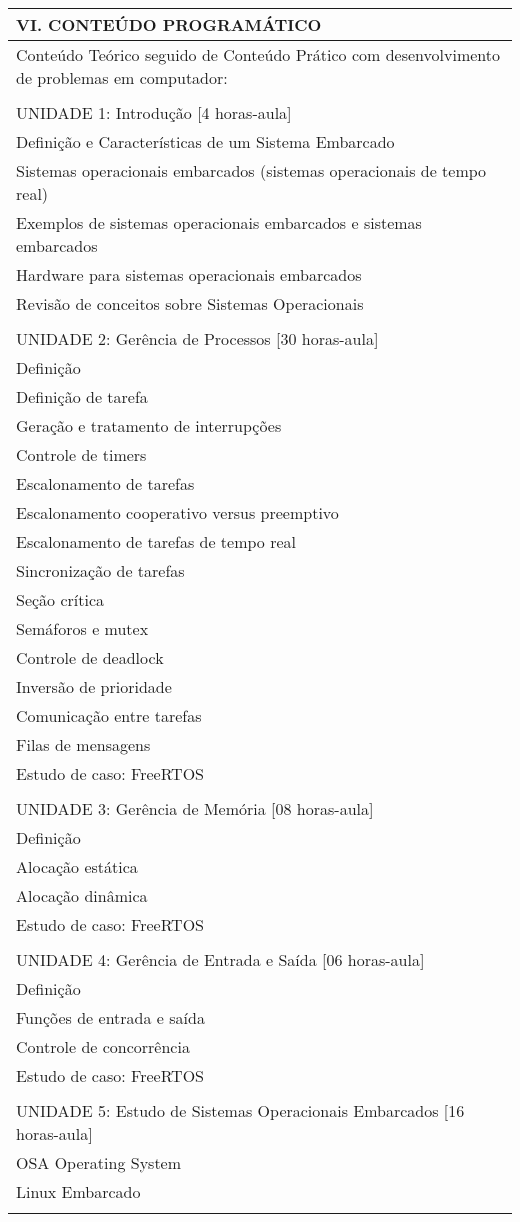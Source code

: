 \documentclass[12pt]{article}
\begin{document}
\begin{longtable}{|L{1.025\textwidth}|} \hline
%
{\bf VI. CONTEÚDO PROGRAMÁTICO } \\ \hline
Conteúdo Teórico seguido de Conteúdo Prático com desenvolvimento de problemas em computador: \\
\\
UNIDADE 1: Introdução [4 horas-aula]\\
Definição e Características de um Sistema Embarcado\\
Sistemas operacionais embarcados (sistemas operacionais de tempo real)\\
Exemplos de sistemas operacionais embarcados e sistemas embarcados\\
Hardware para sistemas operacionais embarcados\\
Revisão de conceitos sobre Sistemas Operacionais\\
\\
UNIDADE 2: Gerência de Processos [30 horas-aula]\\
Definição\\
Definição de tarefa\\
Geração e tratamento de interrupções\\
Controle de timers\\
Escalonamento de tarefas\\
Escalonamento cooperativo versus preemptivo\\
Escalonamento de tarefas de tempo real\\
Sincronização de tarefas\\
Seção crítica\\
Semáforos e mutex\\
Controle de deadlock\\
Inversão de prioridade\\
Comunicação entre tarefas\\
Filas de mensagens\\
Estudo de caso: FreeRTOS\\
\\
UNIDADE 3: Gerência de Memória [08 horas-aula]\\
Definição\\
Alocação estática\\
Alocação dinâmica\\
Estudo de caso: FreeRTOS\\
\\
UNIDADE 4: Gerência de Entrada e Saída [06 horas-aula]\\
Definição\\
Funções de entrada e saída\\
Controle de concorrência\\
Estudo de caso: FreeRTOS\\
\\
UNIDADE 5: Estudo de Sistemas Operacionais Embarcados [16 horas-aula]\\
OSA Operating System\\
Linux Embarcado\\
\\ \hline
\end{longtable} 
\end{document}

